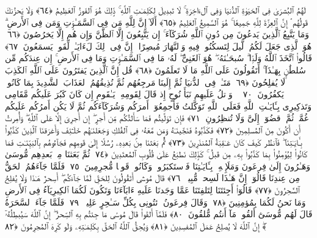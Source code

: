  لَهُمُ ٱلبُشرَىٰ فِى ٱلحَيَوٰةِ ٱلدُّنيَا وَفِى ٱلءَاخِرَةِ ۚ لَا تَبدِيلَ لِكَلِمَـٰتِ ٱللَّهِ ۚ ذَٟلِكَ هُوَ ٱلفَوزُ ٱلعَظِيمُ ﴿٦٤﴾
 وَلَا يَحزُنكَ قَولُهُم ۘ إِنَّ ٱلعِزَّةَ لِلَّهِ جَمِيعًا ۚ هُوَ ٱلسَّمِيعُ ٱلعَلِيمُ ﴿٦٥﴾
 أَلَآ إِنَّ لِلَّهِ مَن فِى ٱلسَّمَـٰوَٟتِ وَمَن فِى ٱلأَرضِ ۗ وَمَا يَتَّبِعُ ٱلَّذِينَ يَدعُونَ مِن دُونِ ٱللَّهِ شُرَكَآءَ ۚ إِن يَتَّبِعُونَ إِلَّا ٱلظَّنَّ وَإِن هُم إِلَّا يَخرُصُونَ ﴿٦٦﴾
 هُوَ ٱلَّذِى جَعَلَ لَكُمُ ٱلَّيلَ لِتَسكُنُوا۟ فِيهِ وَٱلنَّهَارَ مُبصِرًا ۚ إِنَّ فِى ذَٟلِكَ لَءَايَـٰتٍۢ لِّقَومٍۢ يَسمَعُونَ ﴿٦٧﴾
 قَالُوا۟ ٱتَّخَذَ ٱللَّهُ وَلَدًۭا ۗ سُبحَـٰنَهُۥ ۖ هُوَ ٱلغَنِىُّ ۖ لَهُۥ مَا فِى ٱلسَّمَـٰوَٟتِ وَمَا فِى ٱلأَرضِ ۚ إِن عِندَكُم مِّن سُلطَٰنٍۭ بِهَـٰذَآ ۚ أَتَقُولُونَ عَلَى ٱللَّهِ مَا لَا تَعلَمُونَ ﴿٦٨﴾
 قُل إِنَّ ٱلَّذِينَ يَفتَرُونَ عَلَى ٱللَّهِ ٱلكَذِبَ لَا يُفلِحُونَ ﴿٦٩﴾
 مَتَـٰعٌۭ فِى ٱلدُّنيَا ثُمَّ إِلَينَا مَرجِعُهُم ثُمَّ نُذِيقُهُمُ ٱلعَذَابَ ٱلشَّدِيدَ بِمَا كَانُوا۟ يَكفُرُونَ ﴿٧٠﴾
 ۞ وَٱتلُ عَلَيهِم نَبَأَ نُوحٍ إِذ قَالَ لِقَومِهِۦ يَـٰقَومِ إِن كَانَ كَبُرَ عَلَيكُم مَّقَامِى وَتَذكِيرِى بِـَٔايَـٰتِ ٱللَّهِ فَعَلَى ٱللَّهِ تَوَكَّلتُ فَأَجمِعُوٓا۟ أَمرَكُم وَشُرَكَآءَكُم ثُمَّ لَا يَكُن أَمرُكُم عَلَيكُم غُمَّةًۭ ثُمَّ ٱقضُوٓا۟ إِلَىَّ وَلَا تُنظِرُونِ ﴿٧١﴾
 فَإِن تَوَلَّيتُم فَمَا سَأَلتُكُم مِّن أَجرٍ ۖ إِن أَجرِىَ إِلَّا عَلَى ٱللَّهِ ۖ وَأُمِرتُ أَن أَكُونَ مِنَ ٱلمُسلِمِينَ ﴿٧٢﴾
 فَكَذَّبُوهُ فَنَجَّينَـٰهُ وَمَن مَّعَهُۥ فِى ٱلفُلكِ وَجَعَلنَـٰهُم خَلَـٰٓئِفَ وَأَغرَقنَا ٱلَّذِينَ كَذَّبُوا۟ بِـَٔايَـٰتِنَا ۖ فَٱنظُر كَيفَ كَانَ عَـٰقِبَةُ ٱلمُنذَرِينَ ﴿٧٣﴾
 ثُمَّ بَعَثنَا مِنۢ بَعدِهِۦ رُسُلًا إِلَىٰ قَومِهِم فَجَآءُوهُم بِٱلبَيِّنَـٰتِ فَمَا كَانُوا۟ لِيُؤمِنُوا۟ بِمَا كَذَّبُوا۟ بِهِۦ مِن قَبلُ ۚ كَذَٟلِكَ نَطبَعُ عَلَىٰ قُلُوبِ ٱلمُعتَدِينَ ﴿٧٤﴾
 ثُمَّ بَعَثنَا مِنۢ بَعدِهِم مُّوسَىٰ وَهَـٰرُونَ إِلَىٰ فِرعَونَ وَمَلَإِي۟هِۦ بِـَٔايَـٰتِنَا فَٱستَكبَرُوا۟ وَكَانُوا۟ قَومًۭا مُّجرِمِينَ ﴿٧٥﴾
 فَلَمَّا جَآءَهُمُ ٱلحَقُّ مِن عِندِنَا قَالُوٓا۟ إِنَّ هَـٰذَا لَسِحرٌۭ مُّبِينٌۭ ﴿٧٦﴾
 قَالَ مُوسَىٰٓ أَتَقُولُونَ لِلحَقِّ لَمَّا جَآءَكُم ۖ أَسِحرٌ هَـٰذَا وَلَا يُفلِحُ ٱلسَّٰحِرُونَ ﴿٧٧﴾
 قَالُوٓا۟ أَجِئتَنَا لِتَلفِتَنَا عَمَّا وَجَدنَا عَلَيهِ ءَابَآءَنَا وَتَكُونَ لَكُمَا ٱلكِبرِيَآءُ فِى ٱلأَرضِ وَمَا نَحنُ لَكُمَا بِمُؤمِنِينَ ﴿٧٨﴾
 وَقَالَ فِرعَونُ ٱئتُونِى بِكُلِّ سَـٰحِرٍ عَلِيمٍۢ ﴿٧٩﴾
 فَلَمَّا جَآءَ ٱلسَّحَرَةُ قَالَ لَهُم مُّوسَىٰٓ أَلقُوا۟ مَآ أَنتُم مُّلقُونَ ﴿٨٠﴾
 فَلَمَّآ أَلقَوا۟ قَالَ مُوسَىٰ مَا جِئتُم بِهِ ٱلسِّحرُ ۖ إِنَّ ٱللَّهَ سَيُبطِلُهُۥٓ ۖ إِنَّ ٱللَّهَ لَا يُصلِحُ عَمَلَ ٱلمُفسِدِينَ ﴿٨١﴾
 وَيُحِقُّ ٱللَّهُ ٱلحَقَّ بِكَلِمَـٰتِهِۦ وَلَو كَرِهَ ٱلمُجرِمُونَ ﴿٨٢﴾
